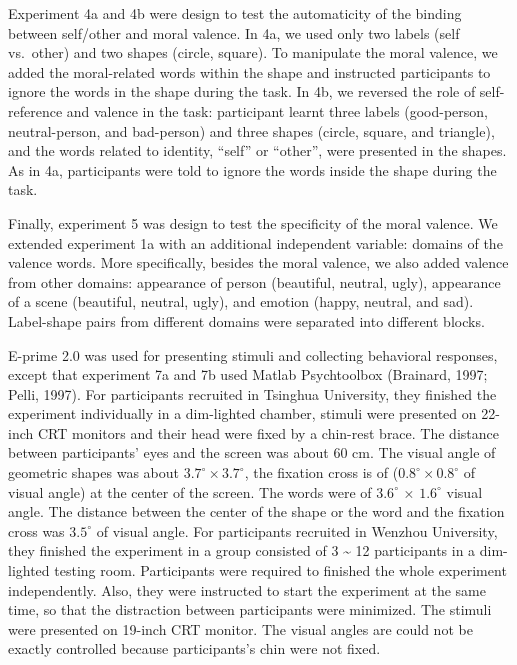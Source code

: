 \documentclass[
  english,
  man]{apa6}
\begin{document}
Experiment 4a and 4b were design to test the automaticity of the binding between self/other and moral valence. In 4a, we used only two labels (self vs.~other) and two shapes (circle, square). To manipulate the moral valence, we added the moral-related words within the shape and instructed participants to ignore the words in the shape during the task. In 4b, we reversed the role of self-reference and valence in the task: participant learnt three labels (good-person, neutral-person, and bad-person) and three shapes (circle, square, and triangle), and the words related to identity, \enquote{self} or \enquote{other}, were presented in the shapes. As in 4a, participants were told to ignore the words inside the shape during the task.

Finally, experiment 5 was design to test the specificity of the moral valence. We extended experiment 1a with an additional independent variable: domains of the valence words. More specifically, besides the moral valence, we also added valence from other domains: appearance of person (beautiful, neutral, ugly), appearance of a scene (beautiful, neutral, ugly), and emotion (happy, neutral, and sad). Label-shape pairs from different domains were separated into different blocks.

E-prime 2.0 was used for presenting stimuli and collecting behavioral responses, except that experiment 7a and 7b used Matlab Psychtoolbox (Brainard, 1997; Pelli, 1997). For participants recruited in Tsinghua University, they finished the experiment individually in a dim-lighted chamber, stimuli were presented on 22-inch CRT monitors and their head were fixed by a chin-rest brace. The distance between participants' eyes and the screen was about 60 cm. The visual angle of geometric shapes was about \(3.7^\circ × 3.7^\circ\), the fixation cross is of (\(0.8^\circ × 0.8^\circ\) of visual angle) at the center of the screen. The words were of \(3.6^\circ\) × \(1.6^\circ\) visual angle. The distance between the center of the shape or the word and the fixation cross was \(3.5^\circ\) of visual angle. For participants recruited in Wenzhou University, they finished the experiment in a group consisted of 3 \textasciitilde{} 12 participants in a dim-lighted testing room. Participants were required to finished the whole experiment independently. Also, they were instructed to start the experiment at the same time, so that the distraction between participants were minimized. The stimuli were presented on 19-inch CRT monitor. The visual angles are could not be exactly controlled because participants's chin were not fixed.
\end{document}
